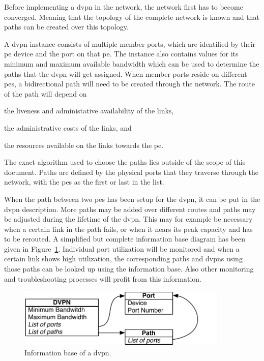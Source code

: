 Before implementing a \ac{dvpn} in the network, the network first has to become converged. Meaning that the topology of the complete network is known and that paths can be created over this topology. 

A \ac{dvpn} instance consists of multiple member ports, which are identified by their \ac{pe} device and the port on that \ac{pe}. The instance also contains values for its minimum and maximum available bandwidth which can be used to determine the paths that the \ac{dvpn} will get assigned. When member ports reside on different \acp{pe}, a bidirectional path will need to be created through the network. The route of the path will depend on 
\begin{inparaenum}
	\item the liveness and administative availability of the links, 
	\item the administrative costs of the links, and 
	\item the resources available on the links towards the \ac{pe}.
\end{inparaenum}
The exact algorithm used to choose the paths lies outside of the scope of this document. Paths are defined by the physical ports that they traverse through the network, with the \acp{pe} as the first or last in the list.

When the path between two \acp{pe} has been setup for the \ac{dvpn}, it can be put in the \ac{dvpn} description. More paths may be added over different routes and paths may be adjusted during the lifetime of the \ac{dvpn}. This may for example be necessary when a certain link in the path fails, or when it nears its peak capacity and has to be rerouted. A simplified but complete information base diagram has been given in Figure~\ref{fig:infobase}. Individual port utilization will be monitored and when a certain link shows high utilization, the corresponding paths and \acp{dvpn} using those paths can be looked up using the information base. Also other monitoring and troubleshooting processes will profit from this information.

\begin{figure}[!h]
	\centering
	\includegraphics[width=10cm]{./includes/infobase.pdf}
	\caption{Information base of a \ac{dvpn}.}
	\label{fig:infobase}
\end{figure}

